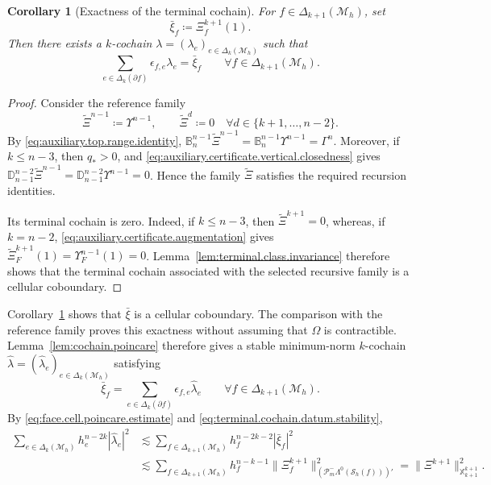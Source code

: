 \documentclass[a4paper,11pt]{article}
\newtheorem{corollary}[theorem]{Corollary}
\theoremstyle{definition}
\newcommand{\Mh}{\mathcal{M}_h}
\newcommand{\Sh}{\mathcal{S}_h}
\newcommand{\FM}[1]{\Delta_{#1}}
\newcommand{\PLtrim}[2]{\mathcal{P}_{#1}^{-}\Lambda^{#2}}
\begin{document}
\begin{corollary}[Exactness of the terminal cochain]
\label{cor:terminal.cochain.exactness}
For $f\in\FM{k+1}(\Mh)$, set
\[
  \bar\xi_f
  \coloneqq
  \Xi_f^{k+1}(1).
\]
Then there exists a $k$-cochain $\lambda=(\lambda_e)_{e\in\FM{k}(\Mh)}$ such that
\[
\sum_{e\in\FM{k}(\partial f)}
\epsilon_{f,e}\lambda_e
=\bar\xi_f
\qquad
  \forall f\in\FM{k+1}(\Mh).
\]
\end{corollary}
\begin{proof}
Consider the reference family
\[
  \widetilde\Xi^{n-1}
  \coloneqq
  \Upsilon^{n-1},
  \qquad
  \widetilde\Xi^d
  \coloneqq
  0
  \quad
  \forall d\in\{k+1,\ldots,n-2\}.
\]
By \eqref{eq:auxiliary.top.range.identity}, $\mathbb B_n^{n-1}\widetilde\Xi^{n-1} = \mathbb B_n^{n-1}\Upsilon^{n-1} = \Gamma^n$.
Moreover, if $k\leq n-3$, then $q_*>0$, and \eqref{eq:auxiliary.certificate.vertical.closedness} gives $\mathbb D_{n-1}^{n-2} \widetilde\Xi^{n-1} = \mathbb D_{n-1}^{n-2} \Upsilon^{n-1} = 0$.
Hence the family $\widetilde\Xi$ satisfies the required recursion identities.

Its terminal cochain is zero.
Indeed, if $k\leq n-3$, then $\widetilde\Xi^{k+1}=0$, whereas, if $k=n-2$, \eqref{eq:auxiliary.certificate.augmentation} gives $\widetilde\Xi_F^{k+1}(1) = \Upsilon_F^{n-1}(1) = 0$.
Lemma~\ref{lem:terminal.class.invariance} therefore shows that the terminal cochain associated with the selected recursive family is a cellular coboundary.
\end{proof}

Corollary~\ref{cor:terminal.cochain.exactness} shows that $\bar\xi$ is a cellular coboundary.
The comparison with the reference family proves this exactness without assuming that $\Omega$ is contractible.
Lemma~\ref{lem:cochain.poincare} therefore gives a stable minimum-norm $k$-cochain $\widehat\lambda=(\widehat\lambda_e)_{e\in\FM{k}(\Mh)}$ satisfying
\begin{equation}\label{eq:global.cochain.problem}
  \bar\xi_f
  =
  \sum_{e\in\FM{k}(\partial f)}
  \epsilon_{f,e}\widehat\lambda_e
  \qquad
  \forall f\in\FM{k+1}(\Mh).
\end{equation}
By \eqref{eq:face.cell.poincare.estimate} and \eqref{eq:terminal.cochain.datum.stability},
\begin{equation*}
\begin{aligned}
  \sum_{e\in\FM{k}(\Mh)}
  h_e^{n-2k}|\widehat\lambda_e|^2
  &\lesssim
  \sum_{f\in\FM{k+1}(\Mh)}
  h_f^{n-2k-2}|\bar\xi_f|^2
  \\
  &\lesssim
  \sum_{f\in\FM{k+1}(\Mh)}
  h_f^{n-k-1}
  \|\Xi_f^{k+1}\|_{\left(\PLtrim{m}{0}(\Sh(f))\right)'}^2
  =
  \|\Xi^{k+1}\|_{\mathbb X_{k+1}^{k+1}}^2.
\end{aligned}
\end{equation*}
\end{document}
